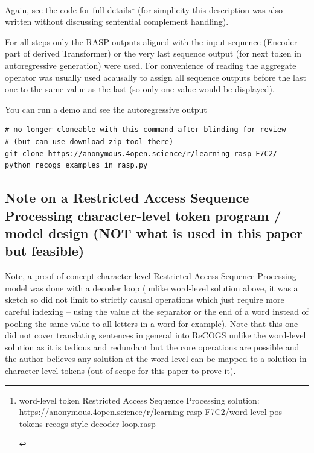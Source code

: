 \documentclass[11pt]{article}
\begin{document}
Again, see the code for full details\footnote{\begin{footnotesize}word-level token Restricted Access Sequence Processing solution: \href{https://anonymous.4open.science/r/learning-rasp-F7C2/word-level-pos-tokens-recogs-style-decoder-loop.rasp}{https://anonymous.4open.science/r/learning-rasp-F7C2/word-level-pos-tokens-recogs-style-decoder-loop.rasp} \end{footnotesize}} (for simplicity this description was also written without discussing sentential complement handling).

For all steps only the RASP outputs aligned with the input sequence (Encoder part of derived Transformer) or the very last sequence output (for next token in autoregressive generation) were used. For convenience of reading the aggregate operator was usually used acausally to assign all sequence outputs before the last one to the same value as the last (so only one value would be displayed).

You can run a demo and see the autoregressive output 

\begin{tiny}
\begin{verbatim}
# no longer cloneable with this command after blinding for review
# (but can use download zip tool there)
git clone https://anonymous.4open.science/r/learning-rasp-F7C2/
python recogs_examples_in_rasp.py
\end{verbatim}
\end{tiny}

\clearpage


\subsection{Note on a Restricted Access Sequence Processing character-level token program / model design (NOT what is used in this paper but feasible)}
\label{rasp_character_level_model_notes}

Note, a proof of concept character level Restricted Access Sequence Processing model was done with a decoder loop (unlike word-level solution above, it was a sketch so did not limit to strictly causal operations which just require more careful indexing -- using the value at the separator or the end of a word instead of pooling the same value to all letters in a word for example). Note that this one did not cover translating sentences in general into ReCOGS unlike the word-level solution as it is tedious and redundant but the core operations are possible and the author believes any solution at the word level can be mapped to a solution in character level tokens (out of scope for this paper to prove it).
\end{document}
